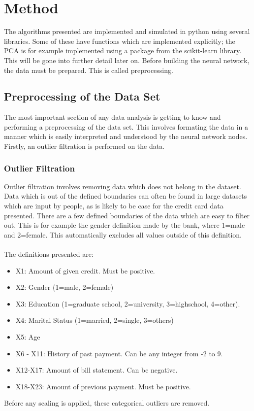 \section{Method}
    The algorithms presented are implemented and simulated in python using several libraries. Some of these have functions which are implemented explicitly; the PCA is for example implemented using a package from the scikit-learn library. This will be gone into further detail later on. Before building the neural network, the data must be prepared. This is called preprocessing.
    \subsection{Preprocessing of the Data Set}
        The most important section of any data analysis is getting to know and performing a preprocessing of the data set. This involves formating the data in a manner which is easily interpreted and understood by the neural network nodes. Firstly, an outlier filtration is performed on the data.
        \subsubsection{Outlier Filtration}
            Outlier filtration involves removing data which does not belong in the dataset. Data which is out of the defined boundaries can often be found in large datasets which are input by people, as is likely to be case for the credit card data presented. There are a few defined boundaries of the data which are easy to filter out. This is for example the gender definition made by the bank, where 1=male and 2=female. This automatically excludes all values outside of this definition.\\\\
            The definitions presented are:
            \begin{itemize}
                \item X1: Amount of given credit. Must be positive.
                \item X2: Gender (1=male, 2=female)
                \item X3: Education (1=graduate school, 2=university, 3=highschool, 4=other).
                \item X4: Marital Status (1=married, 2=single, 3=others)
                \item X5: Age
                \item X6 - X11: History of past payment. Can be any integer from -2 to 9.
                \item X12-X17: Amount of bill statement. Can be negative.
                \item X18-X23: Amount of previous payment. Must be positive.
            \end{itemize}
            Before any scaling is applied, these categorical outliers are removed.
